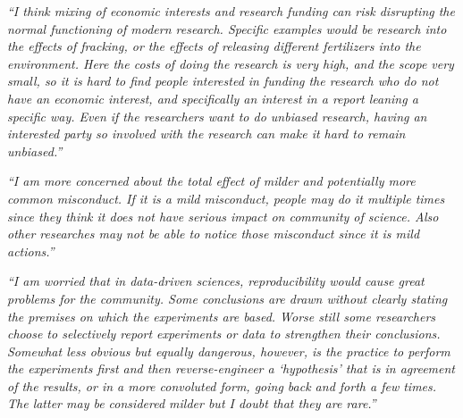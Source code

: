 \documentclass[portrait,11pt]{seminar}
\begin{document}
{\it ``I think mixing of economic interests and research funding can risk disrupting the normal functioning of modern research. Specific examples would be research into the effects of fracking, or the effects of releasing different fertilizers into the environment. Here the costs of doing the research is very high, and the scope very small, so it is hard to find people interested in funding the research who do not have an economic interest, and specifically an interest in a report leaning a specific way. Even if the researchers want to do unbiased research, having an interested party so involved with the research can make it hard to remain unbiased.''}


{\it ``I am more concerned about the total effect of milder and potentially more common misconduct. If it is a mild misconduct, people may do it multiple times since they think it does not have serious impact on community of science. Also other researches may not be able to notice those misconduct since it is mild actions.''}

\es
\bs


{\it ``I am worried that in data-driven sciences, reproducibility would cause great problems for the community. Some conclusions are drawn without clearly stating the premises on which the experiments are based. Worse still some researchers choose to selectively report experiments or data to strengthen their conclusions. Somewhat less obvious but equally dangerous, however, is the practice to perform the experiments first and then reverse-engineer a ‘hypothesis’ that is in agreement of the results, or in a more convoluted form, going back and forth a few times. The latter may be considered milder but I doubt that they are rare.''}

\es
\end{document}
